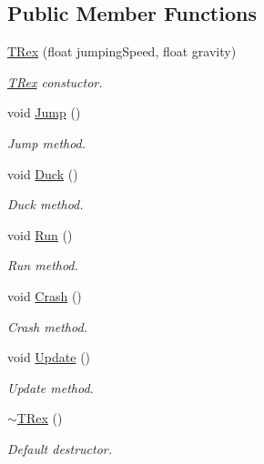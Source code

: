 \subsection*{Public Member Functions}
\begin{DoxyCompactItemize}
\item 
\mbox{\hyperlink{class_t_rex_ae762432f9b24294e971b9f62191f26e9}{T\+Rex}} (float jumping\+Speed, float gravity)
\begin{DoxyCompactList}\small\item\em \mbox{\hyperlink{class_t_rex}{T\+Rex}} constuctor. \end{DoxyCompactList}\item 
void \mbox{\hyperlink{class_t_rex_abc238b8e1df77d79f259cadd3a6c4cc8}{Jump}} ()
\begin{DoxyCompactList}\small\item\em Jump method. \end{DoxyCompactList}\item 
void \mbox{\hyperlink{class_t_rex_a1e672bcdbbeab5bc66c1812e3be30fd3}{Duck}} ()
\begin{DoxyCompactList}\small\item\em Duck method. \end{DoxyCompactList}\item 
void \mbox{\hyperlink{class_t_rex_af0e9ccbecc23739201a85e489da81efd}{Run}} ()
\begin{DoxyCompactList}\small\item\em Run method. \end{DoxyCompactList}\item 
\mbox{\label{class_t_rex_a8881cde6c1a996532fa34cdb413ac441}} 
void \mbox{\hyperlink{class_t_rex_a8881cde6c1a996532fa34cdb413ac441}{Crash}} ()
\begin{DoxyCompactList}\small\item\em Crash method. \end{DoxyCompactList}\item 
void \mbox{\hyperlink{class_t_rex_aaef538213b79fb870e8af8f0cdf39a14}{Update}} ()
\begin{DoxyCompactList}\small\item\em Update method. \end{DoxyCompactList}\item 
\mbox{\label{class_t_rex_a55dbaec9e6c442749133aaf017675c02}} 
\mbox{\hyperlink{class_t_rex_a55dbaec9e6c442749133aaf017675c02}{$\sim$\+T\+Rex}} ()
\begin{DoxyCompactList}\small\item\em Default destructor. \end{DoxyCompactList}\end{DoxyCompactItemize}
